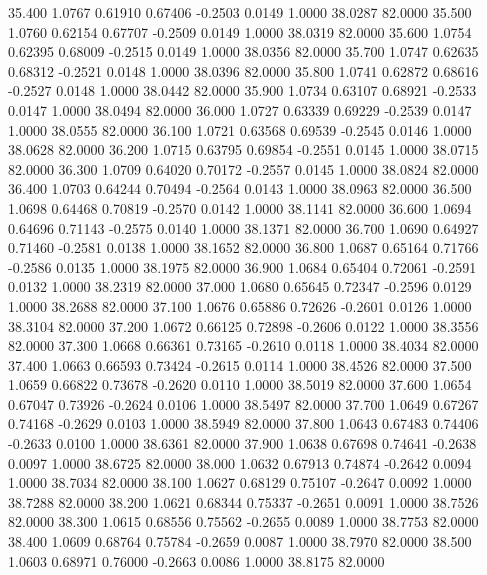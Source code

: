   35.400   1.0767   0.61910   0.67406  -0.2503   0.0149   1.0000  38.0287  82.0000
  35.500   1.0760   0.62154   0.67707  -0.2509   0.0149   1.0000  38.0319  82.0000
  35.600   1.0754   0.62395   0.68009  -0.2515   0.0149   1.0000  38.0356  82.0000
  35.700   1.0747   0.62635   0.68312  -0.2521   0.0148   1.0000  38.0396  82.0000
  35.800   1.0741   0.62872   0.68616  -0.2527   0.0148   1.0000  38.0442  82.0000
  35.900   1.0734   0.63107   0.68921  -0.2533   0.0147   1.0000  38.0494  82.0000
  36.000   1.0727   0.63339   0.69229  -0.2539   0.0147   1.0000  38.0555  82.0000
  36.100   1.0721   0.63568   0.69539  -0.2545   0.0146   1.0000  38.0628  82.0000
  36.200   1.0715   0.63795   0.69854  -0.2551   0.0145   1.0000  38.0715  82.0000
  36.300   1.0709   0.64020   0.70172  -0.2557   0.0145   1.0000  38.0824  82.0000
  36.400   1.0703   0.64244   0.70494  -0.2564   0.0143   1.0000  38.0963  82.0000
  36.500   1.0698   0.64468   0.70819  -0.2570   0.0142   1.0000  38.1141  82.0000
  36.600   1.0694   0.64696   0.71143  -0.2575   0.0140   1.0000  38.1371  82.0000
  36.700   1.0690   0.64927   0.71460  -0.2581   0.0138   1.0000  38.1652  82.0000
  36.800   1.0687   0.65164   0.71766  -0.2586   0.0135   1.0000  38.1975  82.0000
  36.900   1.0684   0.65404   0.72061  -0.2591   0.0132   1.0000  38.2319  82.0000
  37.000   1.0680   0.65645   0.72347  -0.2596   0.0129   1.0000  38.2688  82.0000
  37.100   1.0676   0.65886   0.72626  -0.2601   0.0126   1.0000  38.3104  82.0000
  37.200   1.0672   0.66125   0.72898  -0.2606   0.0122   1.0000  38.3556  82.0000
  37.300   1.0668   0.66361   0.73165  -0.2610   0.0118   1.0000  38.4034  82.0000
  37.400   1.0663   0.66593   0.73424  -0.2615   0.0114   1.0000  38.4526  82.0000
  37.500   1.0659   0.66822   0.73678  -0.2620   0.0110   1.0000  38.5019  82.0000
  37.600   1.0654   0.67047   0.73926  -0.2624   0.0106   1.0000  38.5497  82.0000
  37.700   1.0649   0.67267   0.74168  -0.2629   0.0103   1.0000  38.5949  82.0000
  37.800   1.0643   0.67483   0.74406  -0.2633   0.0100   1.0000  38.6361  82.0000
  37.900   1.0638   0.67698   0.74641  -0.2638   0.0097   1.0000  38.6725  82.0000
  38.000   1.0632   0.67913   0.74874  -0.2642   0.0094   1.0000  38.7034  82.0000
  38.100   1.0627   0.68129   0.75107  -0.2647   0.0092   1.0000  38.7288  82.0000
  38.200   1.0621   0.68344   0.75337  -0.2651   0.0091   1.0000  38.7526  82.0000
  38.300   1.0615   0.68556   0.75562  -0.2655   0.0089   1.0000  38.7753  82.0000
  38.400   1.0609   0.68764   0.75784  -0.2659   0.0087   1.0000  38.7970  82.0000
  38.500   1.0603   0.68971   0.76000  -0.2663   0.0086   1.0000  38.8175  82.0000
